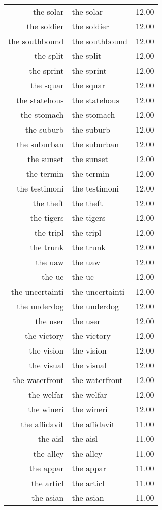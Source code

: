 \begin{table}[ht]
\begin{tabular}{rlr}
  the solar & the solar & 12.00 \\ 
  the soldier & the soldier & 12.00 \\ 
  the southbound & the southbound & 12.00 \\ 
  the split & the split & 12.00 \\ 
  the sprint & the sprint & 12.00 \\ 
  the squar & the squar & 12.00 \\ 
  the statehous & the statehous & 12.00 \\ 
  the stomach & the stomach & 12.00 \\ 
  the suburb & the suburb & 12.00 \\ 
  the suburban & the suburban & 12.00 \\ 
  the sunset & the sunset & 12.00 \\ 
  the termin & the termin & 12.00 \\ 
  the testimoni & the testimoni & 12.00 \\ 
  the theft & the theft & 12.00 \\ 
  the tigers & the tigers & 12.00 \\ 
  the tripl & the tripl & 12.00 \\ 
  the trunk & the trunk & 12.00 \\ 
  the uaw & the uaw & 12.00 \\ 
  the uc & the uc & 12.00 \\ 
  the uncertainti & the uncertainti & 12.00 \\ 
  the underdog & the underdog & 12.00 \\ 
  the user & the user & 12.00 \\ 
  the victory & the victory & 12.00 \\ 
  the vision & the vision & 12.00 \\ 
  the visual & the visual & 12.00 \\ 
  the waterfront & the waterfront & 12.00 \\ 
  the welfar & the welfar & 12.00 \\ 
  the wineri & the wineri & 12.00 \\ 
  the affidavit & the affidavit & 11.00 \\ 
  the aisl & the aisl & 11.00 \\ 
  the alley & the alley & 11.00 \\ 
  the appar & the appar & 11.00 \\ 
  the articl & the articl & 11.00 \\ 
  the asian & the asian & 11.00 \\ 

\end{tabular}
\end{table}
